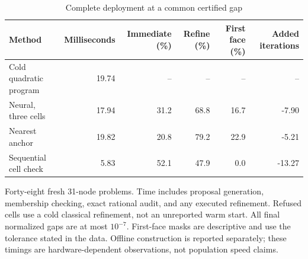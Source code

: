\begin{table}[t]
\centering\small
\caption{Complete deployment at a common certified gap}\label{tab:r13-matched}
\begin{tabular}{lrrrrr}\toprule
Method & Milliseconds & Immediate (\%) & Refine (\%) & First face (\%) & Added iterations \\\midrule
Cold quadratic program & 19.74 & -- & -- & -- & -- \\
Neural, three cells & 17.94 & 31.2 & 68.8 & 16.7 & -7.90 \\
Nearest anchor & 19.82 & 20.8 & 79.2 & 22.9 & -5.21 \\
Sequential cell check & 5.83 & 52.1 & 47.9 & 0.0 & -13.27 \\
\bottomrule\end{tabular}
\par\smallskip\begin{minipage}{.96\textwidth}\footnotesize Forty-eight fresh 31-node problems. Time includes proposal generation, membership checking, exact rational audit, and any executed refinement. Refused cells use a cold classical refinement, not an unreported warm start. All final normalized gaps are at most $10^{-7}$. First-face masks are descriptive and use the tolerance stated in the data. Offline construction is reported separately; these timings are hardware-dependent observations, not population speed claims.\end{minipage}
\end{table}
